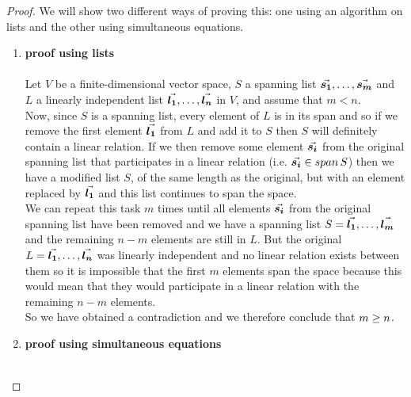 \documentclass[MathsNotesBase.tex]{subfiles}
\begin{document}
{	\medskip
	\begin{proof}
		We will show two different ways of proving this: one using an algorithm on lists and the other using simultaneous equations.
		\begin{enumerate}[label=(\roman*)]
			\item{\textbf{proof using lists}\\\\
				Let $V$ be a finite-dimensional vector space, $S$ a spanning list ${ \vec{\bm{s_1}}, \dots, \vec{\bm{s_m}} }$ and $L$ a linearly independent list ${ \vec{\bm{l_1}},\dots, \vec{\bm{l_n}} }$ in $V$, and assume that ${ m < n }$.\\
				Now, since $S$ is a spanning list, every element of $L$ is in its span and so if we remove the first element $\vec{\bm{l_1}}$ from $L$ and add it to $S$ then $S$ will definitely contain a linear relation. If we then remove some element $\vec{\bm{s_i}}$ from the original spanning list that participates in a linear relation (i.e. ${ \vec{\bm{s_i}} \in span\,S }$) then we have a modified list $S$, of the same length as the original, but with an element replaced by $\vec{\bm{l_1}}$ and this list continues to span the space.\\
				We can repeat this task $m$ times until all elements $\vec{\bm{s_i}}$ from the original spanning list have been removed and we have a spanning list ${ S = \vec{\bm{l_1}},\dots, \vec{\bm{l_m}} }$ and the remaining ${ n - m }$ elements are still in $L$. But the original ${ L = \vec{\bm{l_1}},\dots, \vec{\bm{l_n}} }$ was linearly independent and no linear relation exists between them so it is impossible that the first $m$ elements span the space because this would mean that they would participate in a linear relation with the remaining ${ n - m }$ elements.\\
				So we have obtained a contradiction and we therefore conclude that ${ m \geq n \qedhere}$.
			}
			\item{\textbf{proof using simultaneous equations}\\\\
}
\end{enumerate}
\end{proof}}
\end{document}
